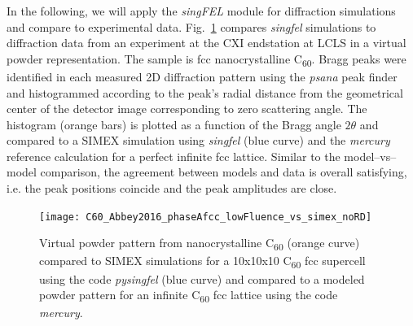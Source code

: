 \documentclass[10pt]{scrartcl}
\begin{document}
In the following, we will
apply the \textit{singFEL} module for diffraction simulations and compare to
experimental data.
Fig.~\ref{fig:C60_virtual_powder_data_vs_models} compares \textit{singfel}
simulations to diffraction data from
an experiment at the CXI endstation at LCLS in a virtual powder representation.
The sample is fcc nanocrystalline C\textsubscript{60}. Bragg peaks were identified in each measured
2D diffraction pattern using the \textit{psana} \cite{psana_www} peak finder
and histogrammed according to the peak's
radial distance from the geometrical center of the detector image corresponding
to zero scattering angle.
The histogram (orange bars) is plotted as a function of the Bragg
angle $2\theta$ and compared to a SIMEX simulation using \textit{singfel}
(blue curve) and the \textit{mercury} reference calculation for a perfect
infinite fcc lattice. Similar to the model--vs--model comparison, the agreement
between models and data is overall satisfying, i.e. the peak positions coincide
and the peak amplitudes are close.
%
\begin{figure}[ht]
  \begin{center}
    \texttt{[image: C60\_Abbey2016\_phaseAfcc\_lowFluence\_vs\_simex\_noRD]}
  \end{center}
  \caption{Virtual powder pattern from nanocrystalline C\textsubscript{60}
  \cite{Abbey2016} (orange curve) compared to SIMEX
  simulations for a 10x10x10 C\textsubscript{60} fcc supercell using the code
  \textit{pysingfel} (blue curve) and compared to a modeled powder pattern for
  an infinite C\textsubscript{60} fcc lattice using the code \textit{mercury}.}
  \label{fig:C60_virtual_powder_data_vs_models}
\end{figure}
%
\end{document}
